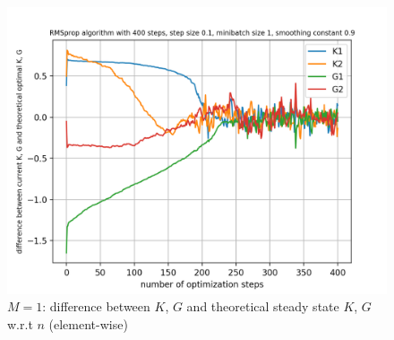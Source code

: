 \documentclass{article}
\begin{document}
\begin{figure}[h!]
\begin{minipage}[t]{.28\paperwidth}
		\includegraphics[width=1.0\textwidth]{Figures/d_M1_sep.png}
		\caption{$M=1$: difference between $K$, $G$ and theoretical steady state $K$, $G$ w.r.t $n$ (element-wise)}
	\end{minipage}
\end{figure}
\end{document}
